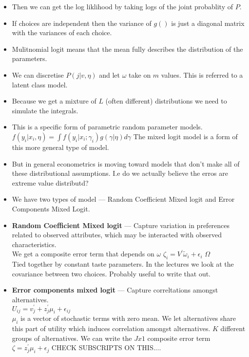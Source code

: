 \documentclass[12pt]{article}
\begin{document}
\begin{itemize}
      \item Then we can get the log liklihood by taking logs of the joint probablity of $P$.
      \item If choices are independent then the variance of $g()$ is just a diagonal matrix with the variances of each choice.
      \item Mulitnomial logit means that the mean fully describes the distribution of the parameters.
      \item We can discretise $P(j|v, \eta)$ and let $\omega$ take on $m$ values. This is referred to a latent class model.
      \item Because we get a mixture of $L$ (often different) distributions we need to simulate the integrals.
      \item This is a specific form of parametric random parameter models.\\
            $f(y_i|x_i, \eta) = \int f(y_i|x_i; \gamma_i) g(\gamma|\eta) d \gamma$ The mixed logit model is a form of this more general type of model.
      \item But in general econometrics is moving toward models that don't make all of these distributional assumptions.
            I.e do we actually believe the erros are extreme value distributd?
      \item We have two types of model --- Random Coefficient Mixed logit and Error Components Mixed Logit.
      \item \textbf{Random Coefficient Mixed logit} --- Capture variation in preferences related to observed attributes, which may be interacted with observed characteristics.\\
            We get a composite error term that depends on $\omega$  $\zeta_i = V^{\prime}\tilde{\omega}_{i} + \epsilon_{i}$  $\varOmega$ \\
            Tied together by constant taste parameters. In the lectures we look at the covariance between two choices. Probably useful to write that out.
      \item \textbf{Error components mixed logit} --- Capture correltations amongst alternatives. \\
            $U_{ij} = v^{\prime}_{j} + z^{\prime}_{j}\mu_i + \epsilon_{ij}$ \\
            $\mu_i$ is a vector of stochastic terms with zero mean. We let alternatives share this part of utility which induces correlation amongst alternatives.
            $K$ different groups of alternatives.
            We can write the $J x 1$ composite error term $\zeta = z^{\prime}_{j}\mu_i + \epsilon_{j}$ CHECK SUBSCRIPTS ON THIS....

\end{itemize}
\end{document}
